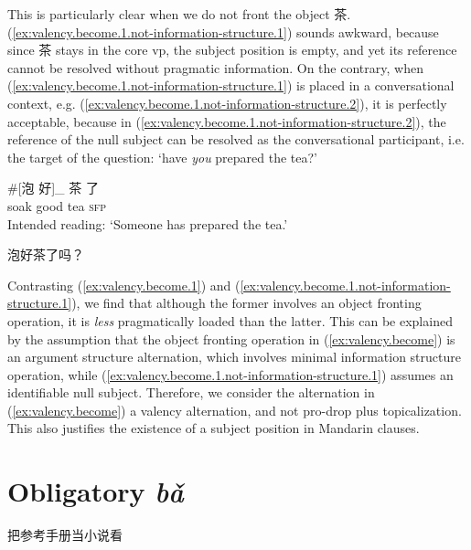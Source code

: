 \documentclass[UTF8, a4paper, oneside, scheme=plain, 12pt]{ctexrep}
\newcommand{\form}[1]{\emph{#1}}
\newcommand{\translate}[1]{`#1'}
\newcommand*{\category}[1]{\textsc{#1}}
\begin{document}
This is particularly clear when we do not front the object 茶.
(\ref{ex:valency.become.1.not-information-structure.1}) sounds awkward,
because since 茶 stays in the core \ac{vp},
the subject position is empty, and yet its reference cannot be resolved
without pragmatic information.
On the contrary, when (\ref{ex:valency.become.1.not-information-structure.1})
is placed in a conversational context,
e.g. (\ref{ex:valency.become.1.not-information-structure.2}),
it is perfectly acceptable, because in (\ref{ex:valency.become.1.not-information-structure.2}),
the reference of the null subject can be resolved as the conversational participant,
i.e. the target of the question:
\translate{have \emph{you} prepared the tea?}

\begin{exe}
    \ex \begin{xlist}
        \ex\label{ex:valency.become.1.not-information-structure.1}
        \gll \#[泡 好]_{} 茶 了 \\
        soak good tea \category{sfp} \\
        \glt Intended reading: \translate{Someone has prepared the tea.}
    
        \ex\label{ex:valency.become.1.not-information-structure.2} 泡好茶了吗？
    \end{xlist}
\end{exe}

Contrasting (\ref{ex:valency.become.1})
and (\ref{ex:valency.become.1.not-information-structure.1}),
we find that although the former involves an object fronting operation,
it is \emph{less} pragmatically loaded than the latter.
This can be explained by the assumption that 
the object fronting operation in (\ref{ex:valency.become})
is an argument structure alternation,
which involves minimal information structure operation,
while (\ref{ex:valency.become.1.not-information-structure.1})
assumes an identifiable null subject.
Therefore, we consider the alternation in (\ref{ex:valency.become})
a valency alternation, and not pro-drop plus topicalization.
This also justifies the existence of a subject position in Mandarin clauses.



\section{Obligatory \form{bǎ}}

\begin{exe}
    \ex 把参考手册当小说看
\end{exe}
\end{document}
